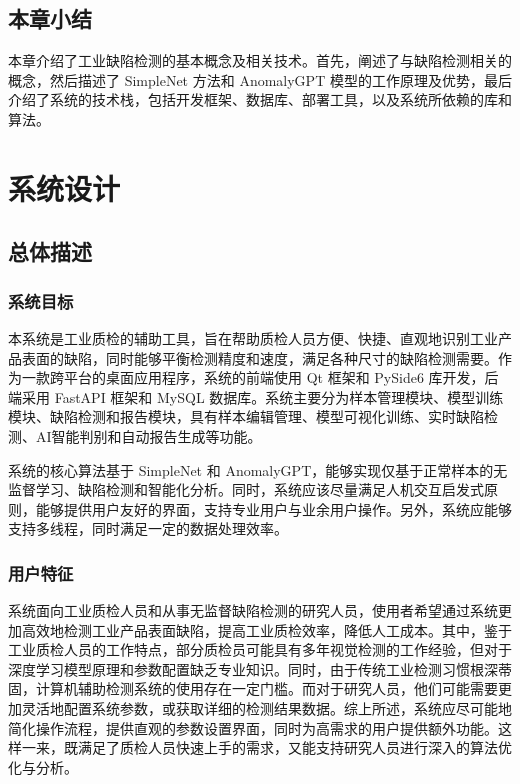 \documentclass[
  ]{njuthesis}
\begin{document}
\section{本章小结}

本章介绍了工业缺陷检测的基本概念及相关技术。首先，阐述了与缺陷检测相关的概念，然后描述了 SimpleNet 方法和 AnomalyGPT 模型的工作原理及优势，最后介绍了系统的技术栈，包括开发框架、数据库、部署工具，以及系统所依赖的库和算法。

\chapter{系统设计}

\section{总体描述}

\subsection{系统目标}

本系统是工业质检的辅助工具，旨在帮助质检人员方便、快捷、直观地识别工业产品表面的缺陷，同时能够平衡检测精度和速度，满足各种尺寸的缺陷检测需要。作为一款跨平台的桌面应用程序，系统的前端使用 Qt 框架和 PySide6 库开发，后端采用 FastAPI 框架和 MySQL 数据库。系统主要分为样本管理模块、模型训练模块、缺陷检测和报告模块，具有样本编辑管理、模型可视化训练、实时缺陷检测、AI智能判别和自动报告生成等功能。

系统的核心算法基于 SimpleNet 和 AnomalyGPT，能够实现仅基于正常样本的无监督学习、缺陷检测和智能化分析。同时，系统应该尽量满足人机交互启发式原则，能够提供用户友好的界面，支持专业用户与业余用户操作。另外，系统应能够支持多线程，同时满足一定的数据处理效率。

\subsection{用户特征}

系统面向工业质检人员和从事无监督缺陷检测的研究人员，使用者希望通过系统更加高效地检测工业产品表面缺陷，提高工业质检效率，降低人工成本。其中，鉴于工业质检人员的工作特点，部分质检员可能具有多年视觉检测的工作经验，但对于深度学习模型原理和参数配置缺乏专业知识。同时，由于传统工业检测习惯根深蒂固，计算机辅助检测系统的使用存在一定门槛。而对于研究人员，他们可能需要更加灵活地配置系统参数，或获取详细的检测结果数据。综上所述，系统应尽可能地简化操作流程，提供直观的参数设置界面，同时为高需求的用户提供额外功能。这样一来，既满足了质检人员快速上手的需求，又能支持研究人员进行深入的算法优化与分析。
\end{document}

